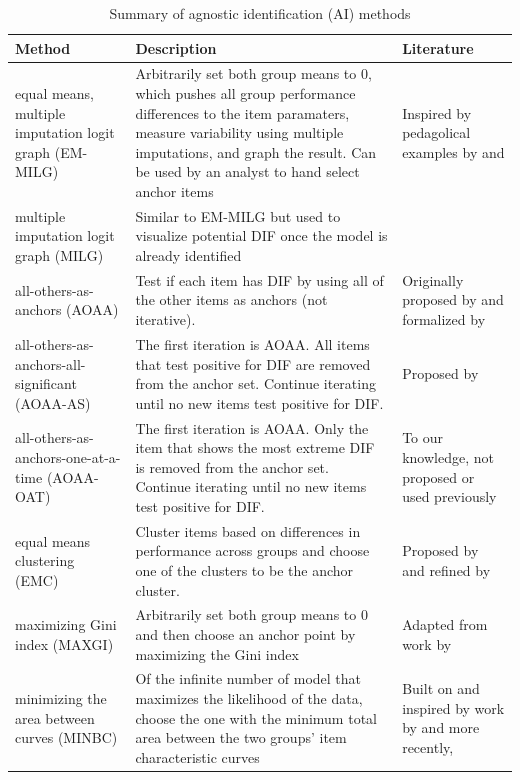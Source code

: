 \documentclass[
  11pt,
]{article}
\begin{document}
\begin{table}[H]
\caption{Summary of agnostic identification (AI) methods}
\centering
\begin{tabular}{|p{4cm}|p{6cm}|p{4cm}|}
\toprule

Method & Description & Literature \\

\midrule

equal means, multiple imputation logit graph (EM-MILG) & Arbitrarily set both group means to 0, which pushes all group performance differences to the item paramaters, measure variability using multiple imputations, and graph the result. Can be used by an analyst to hand select anchor items & Inspired by pedagolical examples by \cite{pohl2017cluster} and \cite{talbot2013taking} \\\hline

multiple imputation logit graph (MILG) & Similar to EM-MILG but used to visualize potential DIF once the model is already identified &  \\\hline

all-others-as-anchors (AOAA) & Test if each item has DIF by using all of the other items as anchors (not iterative). & Originally proposed by \cite{lord1980} and formalized by \cite{thissen1993detection} \\\hline

all-others-as-anchors-all-significant (AOAA-AS) & The first iteration is AOAA. All items that test positive for DIF are removed from the anchor set. Continue iterating until no new items test positive for DIF. & Proposed by \cite{drasgow1987study} \\\hline

all-others-as-anchors-one-at-a-time (AOAA-OAT) & The first iteration is AOAA. Only the item that shows the most extreme DIF is removed from the anchor set. Continue iterating until no new items test positive for DIF. & To our knowledge, not proposed or used previously \\\hline

equal means clustering (EMC) & Cluster items based on differences in performance across groups and choose one of the clusters to be the anchor cluster. & Proposed by \cite{bechger2015statistical} and refined by \cite{pohl2017cluster} \\\hline

maximizing Gini index (MAXGI) & Arbitrarily set both group means to 0 and then choose an anchor point by maximizing the Gini index & Adapted from work by \cite{strobl2018anchor} \\\hline

minimizing the area between curves (MINBC) & Of the infinite number of model that maximizes the likelihood of the data, choose the one with the minimum total area between the two groups' item characteristic curves & Built on and inspired by work by \cite{raju1988area} and more recently, \cite{chalmers2016might} \\

\bottomrule
\end{tabular}
\label{table:allmethods}
\end{table}
\end{document}
